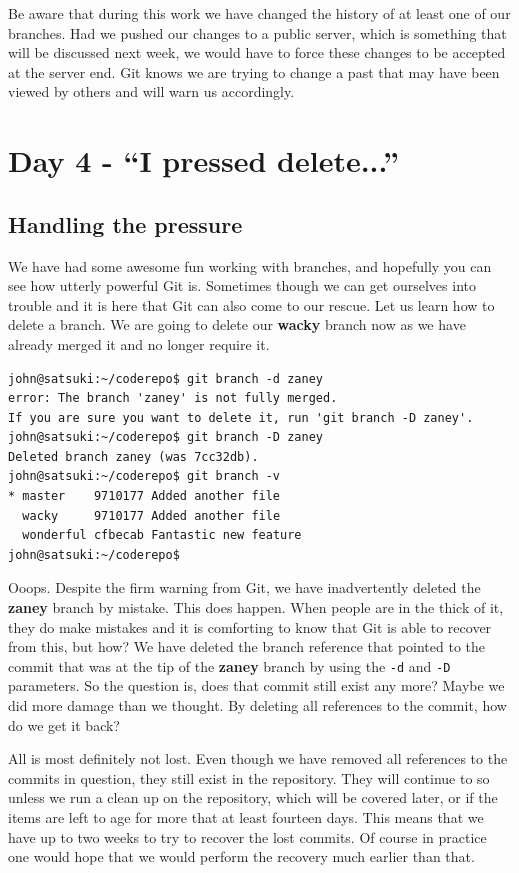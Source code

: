 Be aware that during this work we have changed the history of at least one of our branches.  Had we pushed our changes to a public server, which is something that will be discussed next week, we would have to force these changes to be accepted at the server end.  Git knows we are trying to change a past that may have been viewed by others and will warn us accordingly.

\section{Day 4 - ``I pressed delete...''}
\subsection{Handling the pressure}

We have had some awesome fun working with branches, and hopefully you can see how utterly powerful Git is.  Sometimes though we can get ourselves into trouble and it is here that Git can also come to our rescue.  Let us learn how to delete a branch.  We are going to delete our \textbf{wacky} branch now as we have already merged it and no longer require it.

\begin{Verbatim}
john@satsuki:~/coderepo$ git branch -d zaney 
error: The branch 'zaney' is not fully merged.
If you are sure you want to delete it, run 'git branch -D zaney'.
john@satsuki:~/coderepo$ git branch -D zaney
Deleted branch zaney (was 7cc32db).
john@satsuki:~/coderepo$ git branch -v
* master    9710177 Added another file
  wacky     9710177 Added another file
  wonderful cfbecab Fantastic new feature
john@satsuki:~/coderepo$ 
\end{Verbatim}

Ooops.  Despite the firm warning from Git, we have inadvertently deleted the \textbf{zaney} branch by mistake.  This does happen.  When people are in the thick of it, they do make mistakes and it is comforting to know that Git is able to recover from this, but how?  We have deleted the branch reference that pointed to the commit that was at the tip of the \textbf{zaney} branch by using the \texttt{-d} and \texttt{-D} parameters.  So the question is, does that commit still exist any more?  Maybe we did more damage than we thought.  By deleting all references to the commit, how do we get it back?

All is most definitely not lost.  Even though we have removed all references to the commits in question, they still exist in the repository.  They will continue to so unless we run a clean up on the repository, which will be covered later, or if the items are left to age for more that at least fourteen days.  This means that we have up to two weeks to try to recover the lost commits.  Of course in practice one would hope that we would perform the recovery much earlier than that.


